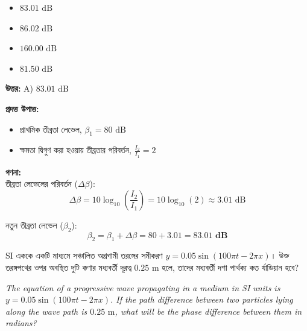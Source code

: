 \documentclass[12pt, a4paper]{article}
\begin{document}
\begin{itemize}[label={}, leftmargin=1cm, itemsep=0.5em]
    \item[\textbf{A)}] $83.01\text{ dB}$
    \item[\textbf{B)}] $86.02\text{ dB}$
    \item[\textbf{C)}] $160.00\text{ dB}$
    \item[\textbf{D)}] $81.50\text{ dB}$
\end{itemize}

\vspace{0.5em}
\begin{tcolorbox}[answerbox]
    \textbf{\color{success} উত্তর:} A) $83.01\text{ dB}$
\end{tcolorbox}
\vspace{1em}

\begin{tcolorbox}[solutionbox={সমাধান (Solution)}]
    \noindent
    \textbf{প্রদত্ত উপাত্ত:}
    \begin{itemize}[leftmargin=1.5em, itemsep=0.2em]
        \item প্রাথমিক তীব্রতা লেভেল, $\beta_1 = 80\text{ dB}$
        \item ক্ষমতা দ্বিগুণ করা হওয়ায় তীব্রতার পরিবর্তন, $\frac{I_2}{I_1} = 2$
    \end{itemize}

    \vspace{0.6em}
    \noindent\textbf{গণনা:} \\
    তীব্রতা লেভেলের পরিবর্তন ($\Delta \beta$):
    \[ \Delta \beta = 10 \log_{10}\left(\frac{I_2}{I_1}\right) = 10 \log_{10}(2) \approx 3.01\text{ dB} \]
    
    নতুন তীব্রতা লেভেল ($\beta_2$):
    \[ \beta_2 = \beta_1 + \Delta \beta = 80 + 3.01 = \mathbf{83.01\text{ dB}} \]
\end{tcolorbox}


\begin{tcolorbox}[questionbox={প্রশ্ন (Question) 8}]
    \noindent
    SI এককে একটি মাধ্যমে সঞ্চালিত অগ্রগামী তরঙ্গের সমীকরণ $y = 0.05 \sin(100\pi t - 2\pi x)$। উক্ত তরঙ্গপথের ওপর অবস্থিত দুটি কণার মধ্যবর্তী দূরত্ব $0.25\text{ m}$ হলে, তাদের মধ্যবর্তী দশা পার্থক্য কত র্যাডিয়ান হবে?
    
    \vspace{0.8em}
    \begin{english}
    \noindent\textit{\color{darkgray}
    The equation of a progressive wave propagating in a medium in SI units is $y = 0.05 \sin(100\pi t - 2\pi x)$. If the path difference between two particles lying along the wave path is $0.25\text{ m}$, what will be the phase difference between them in radians?
    }
    \end{english}
\end{tcolorbox}
\end{document}
